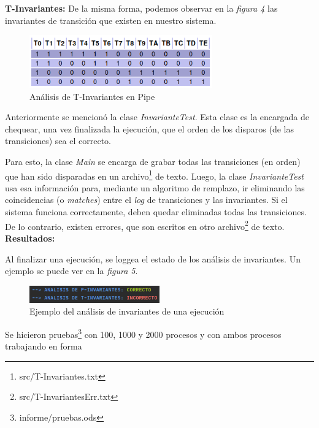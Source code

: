 \documentclass{article}
\newcommand{\fninv}{src/T-Invariantes.txt}
\newcommand{\fninverr}{src/T-InvariantesErr.txt}
\newcommand{\fnpruebas}{informe/pruebas.ods}
\begin{document}
    \textbf{T-Invariantes:} \newline \newline
    De la misma forma, podemos observar en la \emph{figura 4} las invariantes de transición
    que existen en nuestro sistema. \\
    \begin{figure}[h]
        \includegraphics[width=0.7\textwidth, center]{t-invariante.png}
        \caption{Análisis de T-Invariantes en Pipe}
    \end{figure}   
    Anteriormente se mencionó la clase \emph{InvarianteTest}. Esta clase es la encargada
    de chequear, una vez finalizada la ejecución, que el orden de los disparos (de las 
    transiciones) sea el correcto. \par
    Para esto, la clase \emph{Main} se encarga de grabar todas las transiciones (en orden) 
    que han sido disparadas en un archivo\footnote{\fninv} de texto. Luego, la
    clase \emph{InvarianteTest} usa esa información para, mediante un algoritmo de remplazo,
    ir eliminando las coincidencias (o \emph{matches}) entre el \emph{log} de transiciones y
    las invariantes. Si el sistema funciona correctamente, deben quedar eliminadas todas las
    transiciones. De lo contrario, existen errores, que son escritos en otro 
    archivo\footnote{\fninverr} de texto. \newline \newline
    \textbf{Resultados:} \newline \newline \par
    Al finalizar una ejecución, se loggea el estado de los análisis de invariantes. Un ejemplo
    se puede ver en la \emph{figura 5}. \par
    \begin{figure}[h]
        \includegraphics[width=0.5\textwidth, center]{analisis-invariantes-ej.png}
        \caption{Ejemplo del análisis de invariantes de una ejecución}
    \end{figure}
    Se hicieron pruebas\footnote{\fnpruebas} con 100, 1000 y 2000 procesos y con ambos procesos trabajando en forma
\end{document}
